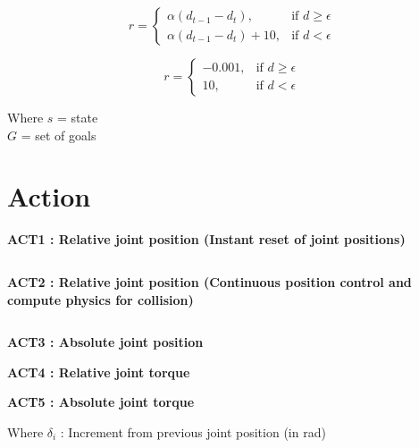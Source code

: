 \documentclass{article}
\begin{document}
\begin{equation}
r = \begin{cases}
\alpha (d_{t-1} - d_t), & \text{if $d \geq \epsilon $}\\
\alpha (d_{t-1} - d_t) + 10, & \text{if $d < \epsilon $}
  \end{cases}
\end{equation}

\begin{equation}
r = \begin{cases}
    - 0.001 , & \text{if $d \geq \epsilon $}\\
    10 , & \text{if $d < \epsilon $}
  \end{cases}
\end{equation}


Where
$s$ = state \\
$G$ = set of goals \\


\section{Action}


\textbf{ACT1 : Relative joint position (Instant reset of joint positions)}

\begin{equation}
[\delta_1, \delta_2, \delta_3, \delta_4, \delta_5, \delta_6]
\end{equation}


\textbf{ACT2 : Relative joint position (Continuous position control and compute physics for collision)}

\begin{equation}
[\delta_1, \delta_2, \delta_3, \delta_4, \delta_5, \delta_6]
\end{equation}


\textbf{ACT3 : Absolute joint position}

\textbf{ACT4 : Relative joint torque}

\textbf{ACT5 : Absolute joint torque}

Where
$\delta_i$ : Increment from previous joint position (in rad) \\
\end{document}
